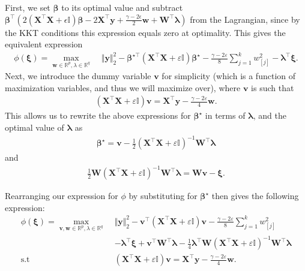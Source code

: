 \documentclass[opre,nonblindrev]{informs3} %
\begin{document}
{First, we set $\bm{\beta}$ to its optimal value and subtract $\bm{\beta}^\top \left(2(\bm{X}^\top \bm{X}+\epsilon\mathbb{I})\bm{\beta}-2\bm{X}^\top \bm{y}+\frac{\gamma-2\epsilon}{2}\bm{w}+\bm{W}^\top \bm{\lambda}\right)$ from the Lagrangian, since by the KKT conditions this expression equals zero at optimality. This gives the equivalent expression
\begin{align*}
	\phi(\bm{\xi})=\max_{\bm{w}\in \mathbb{R}^p,\lambda\in \mathbb{R}^q}\;& \Vert \bm{y}\Vert_2^2-\bm{\beta}^{\star\top} \left(\bm{X}^\top \bm{X}+\varepsilon\mathbb{I}\right)\bm{\beta}^\star - \frac{\gamma-2\varepsilon}{8} \sum_{j=1}^k w_{[j]}^2 -\bm{\lambda}^\top \bm{\xi}.
\end{align*}
Next, we introduce the dummy variable $\bm{v}$ for simplicity (which is a function of maximization variables, and thus we will maximize over), where $\bm{v}$ is such that
\begin{align*}
    \left(\bm{X}^\top \bm{X}+\varepsilon\mathbb{I}\right)\bm{v}=\bm{X}^\top \bm{y}-\frac{\gamma-2\varepsilon}{4}\bm{w}.
\end{align*}
This allows us to rewrite the above expressions for $\bm{\beta}^\star$ in terms of $\bm{\lambda}$, and the optimal value of $\bm{\lambda}$ as 
\begin{align*}
    \bm{\beta}^\star=\bm{v}-\frac{1}{2}\left(\bm{X}^\top \bm{X}+\varepsilon\mathbb{I}\right)^{-1} \bm{W}^\top \bm{\lambda}
\end{align*}
and 
\begin{align*}
    \frac{1}{2}\bm{W}\left(\bm{X}^\top \bm{X}+\varepsilon \mathbb{I}\right)^{-1} \bm{W}^\top \bm{\lambda}=\bm{W}\bm{v}-\bm{\xi}.
\end{align*}

Rearranging our expression for $\phi$ by substituting for $\bm{\beta}^\star$ then gives the following expression:
\begin{align*}
	\phi(\bm{\xi})=\max_{\bm{v}, \bm{w}\in \mathbb{R}^p,\lambda\in \mathbb{R}^q}\;& \Vert \bm{y}\Vert_2^2-\bm{v}^\top \left(\bm{X}^\top \bm{X}+\varepsilon\mathbb{I}\right)\bm{v} - \frac{\gamma-2\varepsilon}{8} \sum_{j=1}^k w_{[j]}^2 \\
 & -\bm{\lambda}^\top \bm{\xi} + \bm{v}^\top \bm{W}^\top \bm{\lambda}-\frac{1}{4}\bm{\lambda}^\top \bm{W}\left(\bm{X}^\top \bm{X}+\varepsilon\mathbb{I}\right)^{-1}\bm{W}^\top\bm{\lambda}\\
 \text{s.t} \quad & \left(\bm{X}^\top \bm{X}+\varepsilon\mathbb{I}\right) \bm{v}=\bm{X}^\top \bm{y}-\frac{\gamma-2\varepsilon}{4}\bm{w}.
\end{align*}

}
\end{document}
